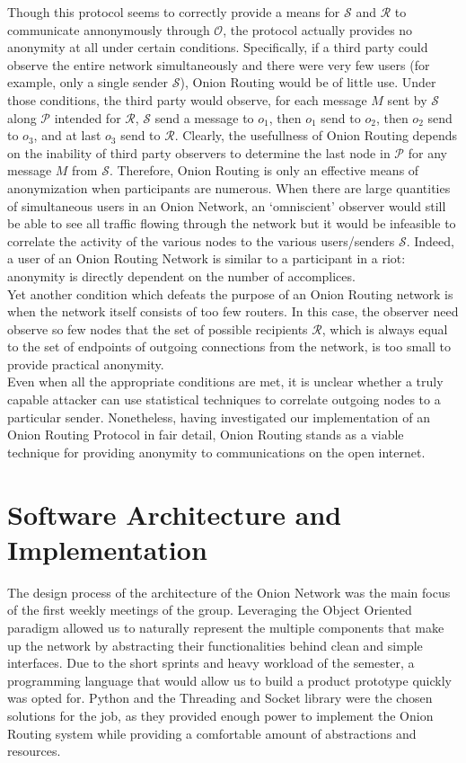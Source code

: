 \documentclass[10pt]{report}
\begin{document}
Though this protocol seems to correctly provide a means for $\mathcal{S}$ and $\mathcal{R}$ to communicate
annonymously through $\mathcal{O}$, the protocol actually provides no anonymity at all under certain conditions.
Specifically, if a third party could observe the entire network simultaneously and there were very few users
(for example, only a single sender $\mathcal{S}$), Onion Routing would be of little use.  Under those conditions,
the third party would observe, for each message $M$ sent by $\mathcal{S}$ along $\mathcal{P}$ intended for
$\mathcal{R}$, $\mathcal{S}$ send a message to $o_1$, then $o_1$ send to $o_2$, then $o_2$ send to $o_3$, and
at last $o_3$ send to $\mathcal{R}$.  Clearly, the usefullness of Onion Routing depends on the inability of
third party observers to determine the last node in $\mathcal{P}$ for any message $M$ from $\mathcal{S}$.
Therefore, Onion Routing is only an effective means of anonymization when participants are numerous.
When there are
large quantities of simultaneous users in an Onion Network, an `omniscient' observer would still be able
to see all traffic flowing through the network but it would be infeasible to correlate the activity of the
various nodes to the various users/senders $\mathcal{S}$.  Indeed, a user of an Onion Routing Network is similar
to a participant in a riot: anonymity is directly dependent on the number of accomplices.\\

Yet another condition which defeats the purpose of an Onion Routing network is when the network itself consists
of too few routers.  In this case, the observer need observe so few nodes that the set of possible recipients
$\mathcal{R}$, which is always equal to the set of endpoints of outgoing connections from the network, is too
small to provide practical anonymity.\\

Even when all the appropriate conditions are met, it is unclear whether a truly capable attacker can use
statistical techniques to correlate outgoing nodes to a particular sender.  Nonetheless, having investigated
our implementation of an Onion Routing Protocol in fair detail, Onion Routing stands as a viable technique for
providing anonymity to communications on the open internet.


\section{Software Architecture and Implementation}
The design process of the architecture of the Onion Network was the main focus of the first weekly
meetings of the group. Leveraging the Object Oriented paradigm allowed us to naturally represent
the multiple components that make up the network by abstracting their functionalities behind clean
and simple interfaces. Due to the short sprints and heavy workload of the semester, a
programming language that would allow us to build a product prototype quickly was opted for. Python and the
Threading and Socket library were the chosen solutions for the job, as they provided enough power to
implement the Onion Routing system while providing a comfortable amount of abstractions and
resources.\\
\end{document}
